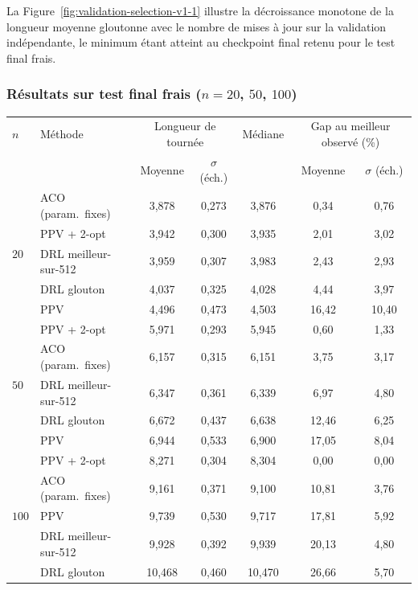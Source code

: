 \documentclass[12pt, a4paper, twoside, openright]{book}
\begin{document}
La Figure~\ref{fig:validation-selection-v1-1} illustre la décroissance monotone de la longueur moyenne gloutonne avec le nombre de mises à jour sur la validation indépendante, le minimum étant atteint au checkpoint final retenu pour le test final frais.

\subsubsection{Résultats sur test final frais ($n=20$, $50$, $100$)}
\label{sec:eval-v1-1-resultats}

\begin{table}[H]
\centering
\small
\begin{tabular}{llccccc}
\toprule
$n$ & Méthode & \multicolumn{2}{c}{Longueur de tournée} & Médiane & \multicolumn{2}{c}{Gap au meilleur observé (\%)} \\
 & & Moyenne & $\sigma$ (éch.) & & Moyenne & $\sigma$ (éch.) \\
\midrule
\multirow{5}{*}{$20$}
 & ACO (param.~fixes) & 3,878 & 0,273 & 3,876 & 0,34 & 0,76 \\
 & PPV + 2-opt & 3,942 & 0,300 & 3,935 & 2,01 & 3,02 \\
 & DRL meilleur-sur-512 & 3,959 & 0,307 & 3,983 & 2,43 & 2,93 \\
 & DRL glouton & 4,037 & 0,325 & 4,028 & 4,44 & 3,97 \\
 & PPV & 4,496 & 0,473 & 4,503 & 16,42 & 10,40 \\
\midrule
\multirow{5}{*}{$50$}
 & PPV + 2-opt & 5,971 & 0,293 & 5,945 & 0,60 & 1,33 \\
 & ACO (param.~fixes) & 6,157 & 0,315 & 6,151 & 3,75 & 3,17 \\
 & DRL meilleur-sur-512 & 6,347 & 0,361 & 6,339 & 6,97 & 4,80 \\
 & DRL glouton & 6,672 & 0,437 & 6,638 & 12,46 & 6,25 \\
 & PPV & 6,944 & 0,533 & 6,900 & 17,05 & 8,04 \\
\midrule
\multirow{5}{*}{$100$}
 & PPV + 2-opt & 8,271 & 0,304 & 8,304 & 0,00 & 0,00 \\
 & ACO (param.~fixes) & 9,161 & 0,371 & 9,100 & 10,81 & 3,76 \\
 & PPV & 9,739 & 0,530 & 9,717 & 17,81 & 5,92 \\
 & DRL meilleur-sur-512 & 9,928 & 0,392 & 9,939 & 20,13 & 4,80 \\
 & DRL glouton & 10,468 & 0,460 & 10,470 & 26,66 & 5,70 \\
\bottomrule
\end{tabular}

\end{table}
\end{document}

